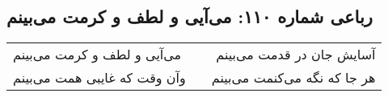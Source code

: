 \begin{center}
\section*{رباعی شماره ۱۱۰: می‌آیی و لطف و کرمت می‌بینم}
\label{sec:110}
\begin{longtable}{l p{0.5cm} r}
می‌آیی و لطف و کرمت می‌بینم
&&
آسایش جان در قدمت می‌بینم
\\
وآن وقت که غایبی همت می‌بینم
&&
هر جا که نگه می‌کنمت می‌بینم
\\
\end{longtable}
\end{center}
